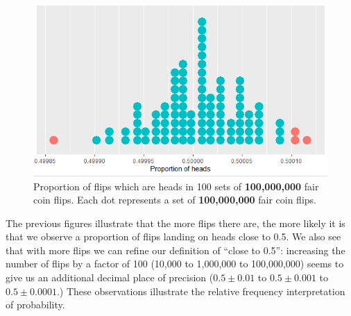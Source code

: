 \documentclass[
]{book}
\theoremstyle{definition}
\theoremstyle{definition}
\theoremstyle{definition}
\theoremstyle{remark}
\begin{document}
\begin{figure}
\includegraphics[width=8.6in]{_graphics/coin-sim3} \caption{Proportion of flips which are heads in 100 sets of \textbf{100,000,000} fair coin flips. Each dot represents a set of \textbf{100,000,000} fair coin flips.}\label{fig:coin-sim3}
\end{figure}

The previous figures illustrate that the more flips there are, the more likely it is that we observe a proportion of flips landing on heads close to 0.5. We also see that with more flips we can refine our definition of ``close to 0.5'': increasing the number of flips by a factor of 100 (10,000 to 1,000,000 to 100,000,000) seems to give us an additional decimal place of precision (\(0.5\pm0.01\) to \(0.5\pm 0.001\) to \(0.5\pm 0.0001\).) These observations illustrate the relative frequency interpretation of probability.
\end{document}
